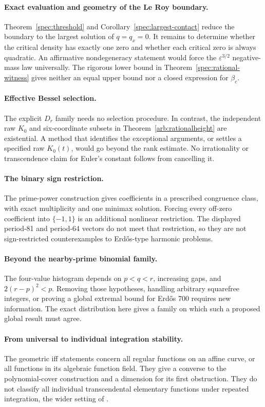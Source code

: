 \documentclass[11pt,a4paper]{article}
\theoremstyle{definition}
\theoremstyle{remark}
\numberwithin{equation}{section}
\begin{document}
\paragraph{Exact evaluation and geometry of the Le Roy boundary.}
Theorem~\ref{spec:threshold} and Corollary~\ref{spec:largest-contact}
reduce the boundary to the largest solution of $q=q_x=0$.
It remains to determine whether the critical density has exactly
one zero and whether each critical zero is always quadratic.
An affirmative nondegeneracy statement would force the
$\varepsilon^{3/2}$ negative-mass law universally. The rigorous
lower bound in Theorem~\ref{spec:rational-witness} gives neither
an equal upper bound nor a closed expression for $\beta_c$.

\paragraph{Effective Bessel selection.}
The explicit $D_r$ family needs no selection procedure. In contrast,
the independent raw $K_0$ and six-coordinate subsets in
Theorem~\ref{arb:rationalheight} are existential. A method that
identifies the exceptional arguments, or settles a specified raw
$K_0(t)$, would go beyond the rank estimate. No irrationality or
transcendence claim for Euler's constant follows from cancelling it.

\paragraph{The binary sign restriction.}
The prime-power construction gives coefficients in a prescribed
congruence class, with exact multiplicity and one minimax solution.
Forcing every off-zero coefficient into $\{-1,1\}$ is an additional
nonlinear restriction. The displayed period-81 and period-64 vectors
do not meet that restriction, so they are not sign-restricted
counterexamples to Erd\H{o}s-type harmonic problems.

\paragraph{Beyond the nearby-prime binomial family.}
The four-value histogram depends on $p<q<r$, increasing gaps, and
$2(r-p)^2<p$. Removing those hypotheses, handling arbitrary squarefree
integers, or proving a global extremal bound for Erd\H{o}s 700 requires
new information. The exact distribution here gives a family on which
such a proposed global result must agree.

\paragraph{From universal to individual integration stability.}
The geometric iff statements concern all regular functions on an
affine curve, or all functions in its algebraic function field.
They give a converse to the polynomial-cover construction and a
dimension for its first obstruction. They do not classify all
individual transcendental elementary functions under repeated
integration, the wider setting of \cite{Chen2022}.
\end{document}
